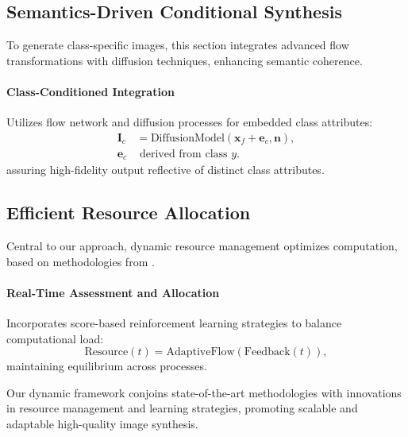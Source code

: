 \subsection{Semantics-Driven Conditional Synthesis}
To generate class-specific images, this section integrates advanced flow transformations with diffusion techniques, enhancing semantic coherence.

\paragraph{Class-Conditioned Integration}
Utilizes flow network and diffusion processes for embedded class attributes:
\begin{align}
\mathbf{I}_c &= \text{DiffusionModel}(\mathbf{x}_f + \mathbf{e}_c, \mathbf{n}),\\
\mathbf{e}_c &\text{ derived from class } y.
\end{align}
assuring high-fidelity output reflective of distinct class attributes.

\subsection{Efficient Resource Allocation}
Central to our approach, dynamic resource management optimizes computation, based on methodologies from \cite{Vincent2011}.

\paragraph{Real-Time Assessment and Allocation}
Incorporates score-based reinforcement learning strategies to balance computational load:
\begin{equation}
\text{Resource}(t) = \text{AdaptiveFlow}(\text{Feedback}(t)),
\end{equation}
maintaining equilibrium across processes.

Our dynamic framework conjoins state-of-the-art methodologies with innovations in resource management and learning strategies, promoting scalable and adaptable high-quality image synthesis.

